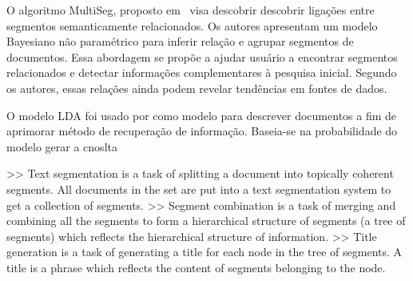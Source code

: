 O algoritmo MultiSeg, proposto em~\cite{} visa descobrir descobrir ligações entre segmentos semanticamente relacionados. Os autores apresentam um modelo Bayesiano não paramétrico para inferir relação e agrupar segmentos de documentos. Essa abordagem se propõe a ajudar usuário a encontrar segmentos relacionados e detectar informações complementares à pesquisa inicial. Segundo os autores, essas relações ainda podem revelar tendências em fontes de dados.

































O modelo LDA foi usado por \cite{XINGWEI} como modelo para descrever documentos a fim de aprimorar método de recuperação de informação. Baseia-se na probabilidade do modelo gerar a cnoslta

















>> Text segmentation is a task of splitting a document into topically coherent segments.  All documents in the set are put into a text segmentation system to get a collection of segments.
>> Segment combination is a task of merging and combining all the segments to form a hierarchical structure of segments (a tree of segments) which reflects the hierarchical structure of information.
>> Title generation is a task of generating a title for each node in the tree of segments. A title is a phrase which reflects the content of segments belonging to the node.


